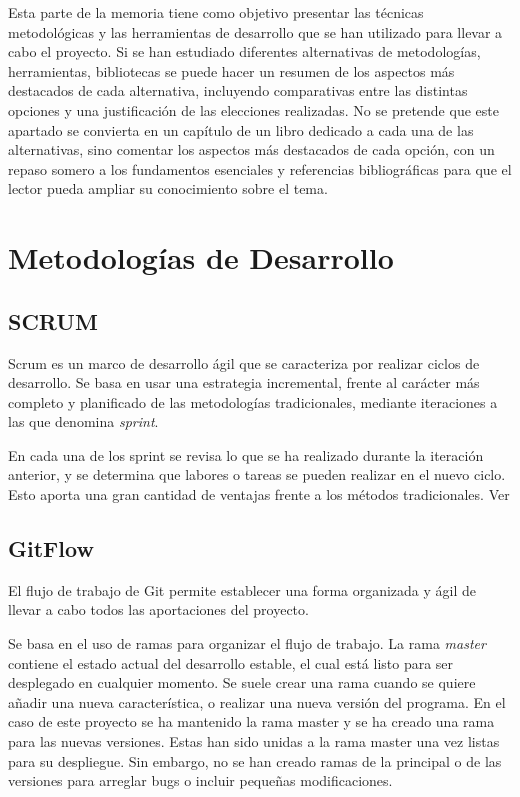 
Esta parte de la memoria tiene como objetivo presentar las técnicas metodológicas y las herramientas de desarrollo que se han utilizado para llevar a cabo el proyecto. Si se han estudiado diferentes alternativas de metodologías, herramientas, bibliotecas se puede hacer un resumen de los aspectos más destacados de cada alternativa, incluyendo comparativas entre las distintas opciones y una justificación de las elecciones realizadas. 
No se pretende que este apartado se convierta en un capítulo de un libro dedicado a cada una de las alternativas, sino comentar los aspectos más destacados de cada opción, con un repaso somero a los fundamentos esenciales y referencias bibliográficas para que el lector pueda ampliar su conocimiento sobre el tema.


\section{Metodologías de Desarrollo}

\subsection{SCRUM}
\label{sub:scrum}

Scrum es un marco de desarrollo ágil que se caracteriza por realizar ciclos de desarrollo. Se basa en usar una estrategia incremental, frente al carácter más completo y planificado de las metodologías tradicionales, mediante iteraciones a las que denomina \textit{sprint}. 

En cada una de los sprint se revisa lo que se ha realizado durante la iteración anterior, y se determina que labores o tareas se pueden realizar en el nuevo ciclo. Esto aporta una gran cantidad de ventajas frente a los métodos tradicionales. Ver \citep{wiki:SCRUM}

\subsection{GitFlow}
\label{sub:gitflow}
El flujo de trabajo de Git permite establecer una forma organizada y ágil de llevar a cabo todos las aportaciones del proyecto. \citep{wiki:gitflow}

Se basa en el uso de ramas para organizar el flujo de trabajo. La rama \textit{master} contiene el estado actual del desarrollo estable, el cual está listo para ser desplegado en cualquier momento. Se suele crear una rama cuando se quiere añadir una nueva característica, o realizar una nueva versión del programa. 
En el caso de este proyecto se ha mantenido la rama master y se ha creado una rama para las nuevas versiones. Estas han sido unidas a la rama master una vez listas para su despliegue.
Sin embargo, no se han creado ramas de la principal o de las versiones para arreglar bugs o incluir pequeñas modificaciones. 

